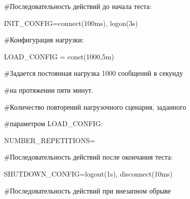 {\sf   \#Последовательность действий до начала теста:}





  \noindent


{\sf   INIT\_CONFIG\;=\;connect(100ms), logon(3s)}





  \noindent


{\sf   \#Конфигурация нагрузки:}





  \noindent


{\sf   LOAD\_CONFIG = const(1000,5m)}





  \noindent


{\sf   \#Задается постоянная нагрузка 1000 сообщений в секунду}





  \noindent


{\sf   \#на протяжении пяти минут.}





  \noindent


{\sf  \#Количество повторений нагрузочного сценария, заданного}





  \noindent


{\sf   \#параметром LOAD\_CONFIG:}





  \noindent


{\sf   NUMBER\_REPETITIONS\;=}





  \noindent


{\sf   \#Последовательность действий после окончания теста:}





  \noindent


{\sf   SHUTDOWN\_CONFIG\;=\;logout(1s), disconnect(10ms)}





  \noindent


{\sf   \#Последовательность действий при внезапном обрыве}





